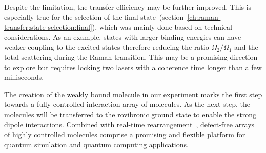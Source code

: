Despite the limitation, the transfer efficiency may be further improved.
This is especially true for the selection
of the final state~(section~\ref{ch:raman-transfer:state-selection:final}),
which was mainly done based on technical considerations.
As an example, states with larger binding energies can have weaker coupling
to the excited states therefore reducing the ratio $\Omega_2/\Omega_1$
and the total scattering during the Raman transition.
This may be a promising direction to explore
but requires locking two lasers with a coherence time longer than a few milliseconds.

The creation of the weakly bound molecule in our experiment marks
the first step towards a fully controlled interaction array of molecules.
As the next step, the molecules will be transferred to the rovibronic ground state
to enable the strong dipole interactions.
Combined with real-time rearrangement~\cite{barredo_atom-by-atom_2016,endres_atom-by-atom_2016},
defect-free arrays of highly controlled molecules comprise a promising
and flexible platform for quantum simulation and quantum computing applications.

